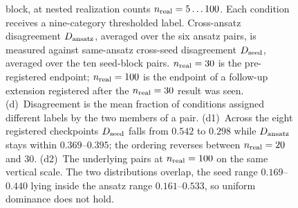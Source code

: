 \documentclass[aip,jap,reprint,superscriptaddress,longbibliography,floatfix]{revtex4-2}
\begin{document}
\begin{figure}[p]
{block, at nested realization counts $n_{\rm real}=5\ldots100$. Each condition
receives a nine-category thresholded label. Cross-ansatz disagreement
$D_{\rm ansatz}$, averaged over the six ansatz pairs, is measured against
same-ansatz cross-seed disagreement $D_{\rm seed}$, averaged over the ten
seed-block pairs. $n_{\rm real}=30$ is the pre-registered endpoint;
$n_{\rm real}=100$ is the endpoint of a follow-up extension registered after the
$n_{\rm real}=30$ result was seen.
(d)~Disagreement is the mean fraction of conditions assigned different labels by
the two members of a pair. (d1)~Across the eight registered checkpoints
$D_{\rm seed}$ falls from $0.542$ to $0.298$ while $D_{\rm ansatz}$ stays within
$0.369$--$0.395$; the ordering reverses between $n_{\rm real}=20$ and $30$.
(d2)~The underlying pairs at $n_{\rm real}=100$ on the same vertical scale. The
two distributions overlap, the seed range $0.169$--$0.440$ lying inside the
ansatz range $0.161$--$0.533$, so uniform dominance does not hold.}

\label{fig:overview}
\end{figure}
 
\end{document}
